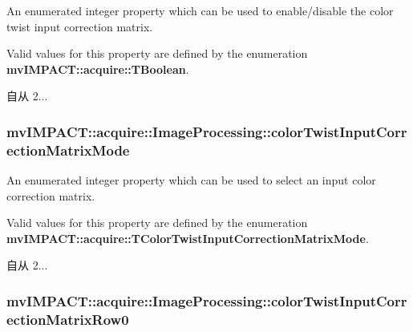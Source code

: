 An enumerated integer property which can be used to enable/disable the color twist input correction matrix. 

Valid values for this property are defined by the enumeration {\bfseries mv\+I\+M\+P\+A\+C\+T\+::acquire\+::\+T\+Boolean}.

\begin{DoxySince}{自从}
2... 
\end{DoxySince}
\hypertarget{classmv_i_m_p_a_c_t_1_1acquire_1_1_image_processing_a7af8df48fdaec0dd1a1dd6edff1a13cd}{
\subsubsection[{color\+Twist\+Input\+Correction\+Matrix\+Mode}]{ mv\+I\+M\+P\+A\+C\+T\+::acquire\+::\+Image\+Processing\+::color\+Twist\+Input\+Correction\+Matrix\+Mode}}\label{classmv_i_m_p_a_c_t_1_1acquire_1_1_image_processing_a7af8df48fdaec0dd1a1dd6edff1a13cd}


An enumerated integer property which can be used to select an input color correction matrix. 

Valid values for this property are defined by the enumeration {\bfseries mv\+I\+M\+P\+A\+C\+T\+::acquire\+::\+T\+Color\+Twist\+Input\+Correction\+Matrix\+Mode}.

\begin{DoxySince}{自从}
2... 
\end{DoxySince}
\hypertarget{classmv_i_m_p_a_c_t_1_1acquire_1_1_image_processing_a697c4174ae80d29018b6595882ee8fed}{
\subsubsection[{color\+Twist\+Input\+Correction\+Matrix\+Row0}]{ mv\+I\+M\+P\+A\+C\+T\+::acquire\+::\+Image\+Processing\+::color\+Twist\+Input\+Correction\+Matrix\+Row0}}\label{classmv_i_m_p_a_c_t_1_1acquire_1_1_image_processing_a697c4174ae80d29018b6595882ee8fed}


